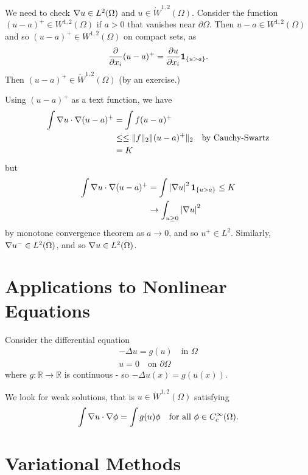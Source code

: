 \documentclass[10pt, oneside, reqno]{amsart}
\theoremstyle{plain}%
\numberwithin{equation}{section}
\theoremstyle{definition}
\theoremstyle{remark}
\newcommand{\R}{\mathbb{R}}
\begin{document}
We need to check $\nabla u \in L^2(\Omega)$ and $u \in \dot W^{1, 2}(\Omega)$.  Consider the function $(u-a)^+ \in W^{1, 2}(\Omega)$ if $a > 0$ that vanishes near $\partial \Omega$.  Then $u - a \in W^{1, 2}(\Omega)$ and so $(u-a)^+ \in W^{1,2}(\Omega)$ on compact sets, as \[
    \frac{\partial }{\partial x_i}(u-a)^+ = \frac{\partial u}{\partial x_i} \mathbf{1}_{\{ u > a \}}.
\]     Then $(u-a)^+ \in \dot W^{1, 2}(\Omega)$ (by an exercise.)

Using $(u-a)^+$ as a text function, we have \begin{align*}
    \int \nabla u \cdot \nabla (u-a)^+ &= \int f (u-a)^+  \\
                                    &\leq \leq \| f \|_2 \| (u-a)^+ \|_2 \quad \text{by Cauchy-Swartz} \\
                                    &= K
\end{align*} but \begin{align*}
    \int \nabla u \cdot \nabla (u-a)^+ &= \int \left| \nabla u \right|^2 \mathbf{1}_{\{ u > a \}} \leq K \\
        &\rightarrow \int_{u \geq 0} \left| \nabla u \right|^2
\end{align*} by monotone convergence theorem as $a \rightarrow 0$, and so $u^+ \in L^2$.  Similarly, $\nabla u^- \in L^2(\Omega)$, and so $\nabla u \in L^2(\Omega)$.



\section{Applications to Nonlinear Equations} %
\label{sec:applications_to_nonlinear_equations}
Consider the differential equation \begin{align*}
    -\Delta u = g(u) \quad \text{in $\Omega$} \\
    u = 0 \quad \text{on $\partial \Omega$}
\end{align*} where $g: \R \rightarrow \R$ is continuous - so $-\Delta u(x) = g(u(x))$.  

We look for weak solutions, that is $u \in \dot W^{1, 2}(\Omega)$ satisfying \begin{equation}
    \label{eq:his_eq_8.1}
    \int \nabla u \cdot \nabla \phi = \int g(u) \phi \quad \text{for all $\phi \in C^\infty_c(\Omega)$.}
\end{equation}

\section{Variational Methods} %
\label{sub:variational_methods}
\end{document}
